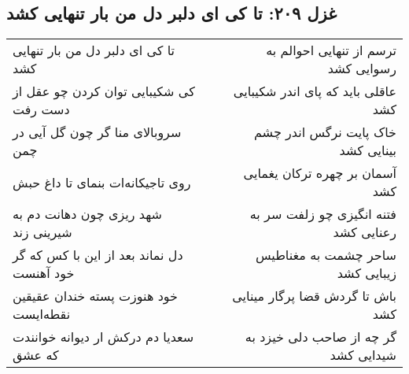 \begin{center}
\section*{غزل ۲۰۹: تا کی ای دلبر دل من بار تنهایی کشد}
\label{sec:209}
\begin{longtable}{l p{0.5cm} r}
تا کی ای دلبر دل من بار تنهایی کشد
&&
ترسم از تنهایی احوالم به رسوایی کشد
\\
کی شکیبایی توان کردن چو عقل از دست رفت
&&
عاقلی باید که پای اندر شکیبایی کشد
\\
سروبالای منا گر چون گل آیی در چمن
&&
خاک پایت نرگس اندر چشم بینایی کشد
\\
روی تاجیکانه‌ات بنمای تا داغ حبش
&&
آسمان بر چهره ترکان یغمایی کشد
\\
شهد ریزی چون دهانت دم به شیرینی زند
&&
فتنه انگیزی چو زلفت سر به رعنایی کشد
\\
دل نماند بعد از این با کس که گر خود آهنست
&&
ساحر چشمت به مغناطیس زیبایی کشد
\\
خود هنوزت پسته خندان عقیقین نقطه‌ایست
&&
باش تا گردش قضا پرگار مینایی کشد
\\
سعدیا دم درکش ار دیوانه خوانندت که عشق
&&
گر چه از صاحب دلی خیزد به شیدایی کشد
\\
\end{longtable}
\end{center}
